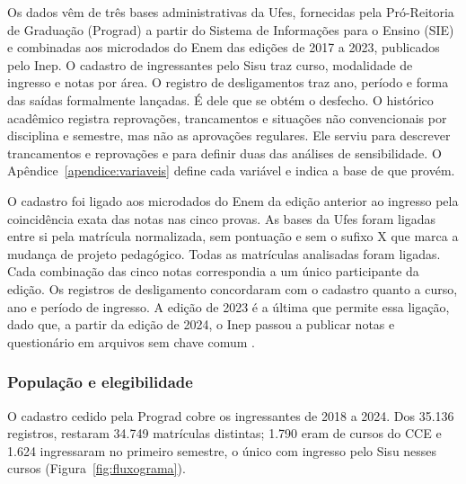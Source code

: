 \documentclass[12pt,a4paper]{article}
\begin{document}
Os dados vêm de três bases administrativas da Ufes, fornecidas pela Pró-Reitoria de Graduação (Prograd) a partir do Sistema de Informações para o Ensino (SIE) e combinadas aos microdados do Enem das edições de 2017 a 2023, publicados pelo Inep. O cadastro de ingressantes pelo Sisu traz curso, modalidade de ingresso e notas por área. O registro de desligamentos traz ano, período e forma das saídas formalmente lançadas. É dele que se obtém o desfecho. O histórico acadêmico registra reprovações, trancamentos e situações não convencionais por disciplina e semestre, mas não as aprovações regulares. Ele serviu para descrever trancamentos e reprovações e para definir duas das análises de sensibilidade. O Apêndice~\ref{apendice:variaveis} define cada variável e indica a base de que provém.

O cadastro foi ligado aos microdados do Enem da edição anterior ao ingresso pela coincidência exata das notas nas cinco provas. As bases da Ufes foram ligadas entre si pela matrícula normalizada, sem pontuação e sem o sufixo X que marca a mudança de projeto pedagógico. Todas as matrículas analisadas foram ligadas. Cada combinação das cinco notas correspondia a um único participante da edição. Os registros de desligamento concordaram com o cadastro quanto a curso, ano e período de ingresso. A edição de 2023 é a última que permite essa ligação, dado que, a partir da edição de 2024, o Inep passou a publicar notas e questionário em arquivos sem chave comum \citep{inep2025leiame}.

\subsubsection{População e elegibilidade}
\label{sec:elegibilidade}

O cadastro cedido pela Prograd cobre os ingressantes de 2018 a 2024. Dos 35.136 registros, restaram 34.749 matrículas distintas; 1.790 eram de cursos do CCE e 1.624 ingressaram no primeiro semestre, o único com ingresso pelo Sisu nesses cursos (Figura~\ref{fig:fluxograma}).
\end{document}
